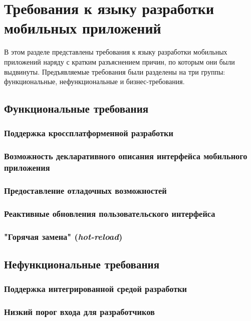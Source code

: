 \section{Требования к языку разработки мобильных приложений}
В этом разделе представлены требования к языку разработки мобильных приложений
наряду с кратким разъяснением причин, по которым они были выдвинуты.
Предъявляемые требования были разделены на три группы: функциональные,
нефункциональные и бизнес-требования.


\subsection{Функциональные требования}
\subsubsection{Поддержка кроссплатформенной разработки}

\subsubsection{Возможность декларативного описания интерфейса мобильного приложения}

\subsubsection{Предоставление отладочных возможностей}

\subsubsection{Реактивные обновления пользовательского интерфейса}

\subsubsection{"Горячая замена" (\textit{hot-reload})}


\subsection{Нефункциональные требования}

\subsubsection{Поддержка интегрированной средой разработки}

\subsubsection{Низкий порог входа для разработчиков}


